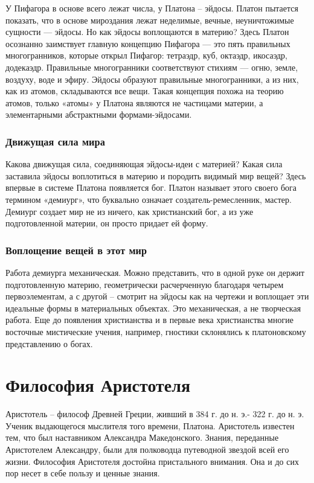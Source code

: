 \documentclass[a4paper, 14pt]{extreport}
\begin{document}
У Пифагора в основе всего лежат числа, у Платона -- эйдосы. Платон
пытается показать, что в основе мироздания лежат неделимые, вечные,
неуничтожимые сущности --- эйдосы. Но как эйдосы воплощаются в материю?
Здесь Платон осознанно заимствует главную концепцию Пифагора --- это
пять правильных многогранников, которые открыл Пифагор: тетраэдр, куб,
октаэдр, икосаэдр, додекаэдр. Правильные многогранники соответствуют
стихиям --- огню, земле, воздуху, воде и эфиру. Эйдосы образуют
правильные многогранники, а из них, как из атомов, складываются все
вещи. Такая концепция похожа на теорию атомов, только «атомы» у Платона
являются не частицами материи, а элементарными абстрактными
формами-эйдосами.

\subsubsection{Движущая сила мира}

Какова движущая сила, соединяющая эйдосы-идеи с материей? Какая сила
заставила эйдосы воплотиться в материю и породить видимый мир вещей?
Здесь впервые в системе Платона появляется бог. Платон называет этого
своего бога термином «демиург», что буквально означает
создатель-ремесленник, мастер. Демиург создает мир не из ничего, как
христианский бог, а из уже подготовленной материи, он просто придает ей
форму.

\subsubsection{Воплощение вещей в этот мир}

Работа демиурга механическая. Можно представить, что в одной руке он
держит подготовленную материю, геометрически расчерченную благодаря
четырем первоэлементам, а с другой -- смотрит на эйдосы как на чертежи и
воплощает эти идеальные формы в материальных объектах. Это механическая,
а не творческая работа. Еще до появления христианства и в первые века
христианства многие восточные мистические учения, например, гностики
склонялись к платоновскому представлению о богах.

\section{Философия Аристотеля}

Аристотель -- философ Древней Греции, живший в 384 г. до н. э.- 322 г.
до н. э. Ученик выдающегося мыслителя того времени, Платона. Аристотель
известен тем, что был наставником Александра Македонского. Знания,
переданные Аристотелем Александру, были для полководца путеводной
звездой всей его жизни. Философия Аристотеля достойна пристального
внимания. Она и до сих пор несет в себе пользу и ценные знания.
\end{document}
